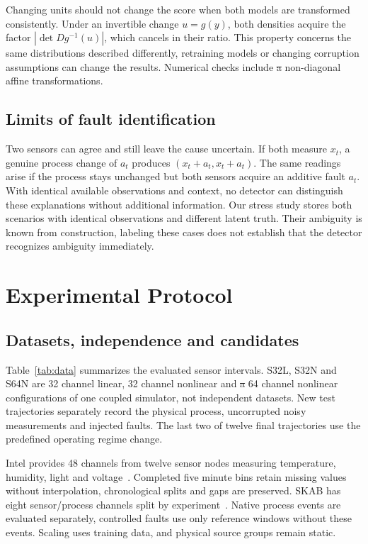 \documentclass{llncs}
\newcommand{\1}{\mathbf{1}}
\providecommand{\DIFdeltex}[1]{{\protect\color{red}\sout{#1}}}                      %
\providecommand{\DIFdelbegin}{} %
\providecommand{\DIFdelend}{} %
\providecommand{\DIFdel}[1]{\texorpdfstring{\DIFdeltex{#1}}{}} %
\begin{document}
Changing units should not change the score when both models are transformed consistently. Under an invertible change $u=g(y)$, both densities acquire the factor $|\det Dg^{-1}(u)|$, which cancels in their ratio. This property concerns the same distributions described differently, retraining models or changing corruption assumptions can change the results. Numerical checks include \DIFdelbegin \DIFdel{a }\DIFdelend non-diagonal affine transformations.

\subsection{Limits of fault identification}
Two sensors can agree and still leave the cause uncertain. If both measure $x_t$, a genuine process change of $a_t$ produces $(x_t+a_t,x_t+a_t)$. The same readings arise if the process stays unchanged but both sensors acquire an additive fault $a_t$. With identical available observations and context, no detector can distinguish these explanations without additional information. Our stress study stores both scenarios with identical observations and different latent truth. Their ambiguity is known from construction, labeling these cases does not establish that the detector recognizes ambiguity immediately.







\section{Experimental Protocol}

\subsection{Datasets, independence and candidates}
Table~\ref{tab:data} summarizes the evaluated sensor intervals. S32L, S32N and S64N are 32 channel linear, 32 channel nonlinear and \DIFdelbegin \DIFdel{a }\DIFdelend 64 channel nonlinear configurations of one coupled simulator, not independent datasets. New test trajectories separately record the physical process, uncorrupted noisy measurements and injected faults. The last two of twelve final trajectories use the predefined operating regime change.

Intel provides 48 channels from twelve sensor nodes measuring temperature, humidity, light and voltage~\cite{intel}. Completed five minute bins retain missing values without interpolation, chronological splits and gaps are preserved. SKAB has eight sensor/process channels split by experiment~\cite{skab}. Native process events are evaluated separately, controlled faults use only reference windows without these events. Scaling uses training data, and physical source groups remain static.
\end{document}
